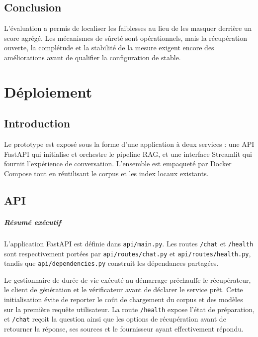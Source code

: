 \section*{Conclusion}

L'évaluation a permis de localiser les faiblesses au lieu de les masquer derrière
un score agrégé. Les mécanismes de sûreté sont opérationnels, mais la récupération
ouverte, la complétude et la stabilité de la mesure exigent encore des améliorations
avant de qualifier la configuration de stable.


\chapter{Déploiement}

\section*{Introduction}

Le prototype est exposé sous la forme d'une application à deux services : une API
FastAPI qui initialise et orchestre le pipeline RAG, et une interface Streamlit
qui fournit l'expérience de conversation. L'ensemble est empaqueté par Docker
Compose tout en réutilisant le corpus et les index locaux existants.

\section{API}

\paragraph{Résumé exécutif}

L'application FastAPI est définie dans \texttt{api/main.py}. Les routes
\texttt{/chat} et \texttt{/health} sont respectivement portées par
\texttt{api/routes/chat.py} et \texttt{api/routes/health.py}, tandis que
\texttt{api/dependencies.py} construit les dépendances partagées.

Le gestionnaire de durée de vie exécuté au démarrage préchauffe le récupérateur,
le client de génération et le vérificateur avant de déclarer le service prêt.
Cette initialisation évite de reporter le coût de chargement du corpus et des
modèles sur la première requête utilisateur. La route \texttt{/health} expose
l'état de préparation, et \texttt{/chat} reçoit la question ainsi que les options
de récupération avant de retourner la réponse, ses sources et le fournisseur
ayant effectivement répondu.

